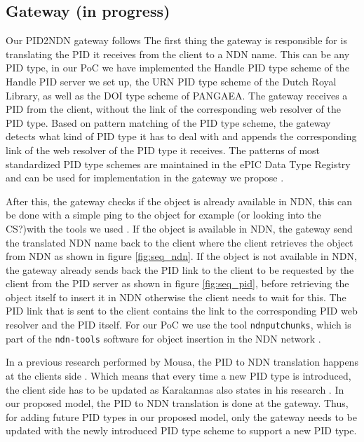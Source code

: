 
\subsection{Gateway (in progress)}\label{gw}
Our PID2NDN gateway follows The first thing the gateway is responsible for is translating the PID it receives from the client to a NDN name. This can be any PID type, in our PoC we have implemented the Handle PID type scheme of the Handle PID server we set up, the URN PID type scheme of the Dutch Royal Library, as well as the DOI type scheme of PANGAEA. The gateway receives a PID from the client, without the link of the corresponding web resolver of the PID type. Based on pattern matching of the PID type scheme, the gateway detects what kind of PID type it has to deal with and appends the corresponding link of the web resolver of the PID type it receives. 
The patterns of most standardized PID type schemes are maintained in the ePIC Data Type Registry and can be used for implementation in the gateway we propose \cite{dtr}. 

After this, the gateway checks if the object is already available in NDN, this can be done with a simple ping to the object for example (or looking into the CS?)with the tools we used \cite{ndn-tools}. 
If the object is available in NDN, the gateway send the translated NDN name back to the client where the client retrieves the object from NDN as shown in figure \ref{fig:seq_ndn}. If the object is not available in NDN, the gateway already sends back the PID link to the client to be requested by the client from the PID server as shown in figure \ref{fig:seq_pid}, before retrieving the object itself to insert it in NDN otherwise the client needs to wait for this.
The PID link that is sent to the client contains the link to the corresponding PID web resolver and the PID itself. For our PoC we use the tool \texttt{ndnputchunks}, which is part of the \texttt{ndn-tools} software for object insertion in the NDN network \cite{ndn-tools}.

In a previous research performed by Mousa, the PID to NDN translation happens at the clients side \cite{ndn-app-aware}. Which means that every time a new PID type is introduced, the client side has to be updated as Karakannas also states in his research \cite{icn-bd}. In our proposed model, the PID to NDN translation is done at the gateway. Thus, for adding future PID types in our proposed model, only the gateway needs to be updated with the newly introduced PID type scheme 
to support a new PID type. 

